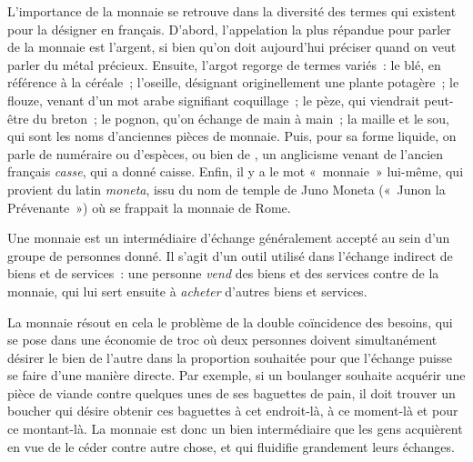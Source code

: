 L'importance de la monnaie se retrouve dans la diversité des termes qui existent pour la désigner en français. D'abord, l'appelation la plus répandue pour parler de la monnaie est l'argent, si bien qu'on doit aujourd'hui préciser quand on veut parler du métal précieux. Ensuite, l'argot regorge de termes variés~: le blé, en référence à la céréale~; l'oseille, désignant originellement une plante potagère~; le flouze, venant d'un mot arabe signifiant coquillage~; le pèze, qui viendrait peut-être du breton~; le pognon, qu'on échange de main à main~; la maille et le sou, qui sont les noms d'anciennes pièces de monnaie. Puis, pour sa forme liquide, on parle de numéraire ou d'espèces, ou bien de , un anglicisme venant de l'ancien français \emph{casse}, qui a donné caisse. Enfin, il y a le mot «~monnaie~» lui-même, qui provient du latin \emph{moneta}, issu du nom de temple de Juno Moneta («~Junon la Prévenante~») où se frappait la monnaie de Rome.

Une monnaie est un intermédiaire d'échange généralement accepté au sein d'un groupe de personnes donné. Il s'agit d'un outil utilisé dans l'échange indirect de biens et de services~: une personne \emph{vend} des biens et des services contre de la monnaie, qui lui sert ensuite à \emph{acheter} d'autres biens et services.

La monnaie résout en cela le problème de la double coïncidence des besoins, qui se pose dans une économie de troc où deux personnes doivent simultanément désirer le bien de l'autre dans la proportion souhaitée pour que l'échange puisse se faire d'une manière directe. Par exemple, si un boulanger souhaite acquérir une pièce de viande contre quelques unes de ses baguettes de pain, il doit trouver un boucher qui désire obtenir ces baguettes à cet endroit-là, à ce moment-là et pour ce montant-là. La monnaie est donc un bien intermédiaire que les gens acquièrent en vue de le céder contre autre chose, et qui fluidifie grandement leurs échanges.

